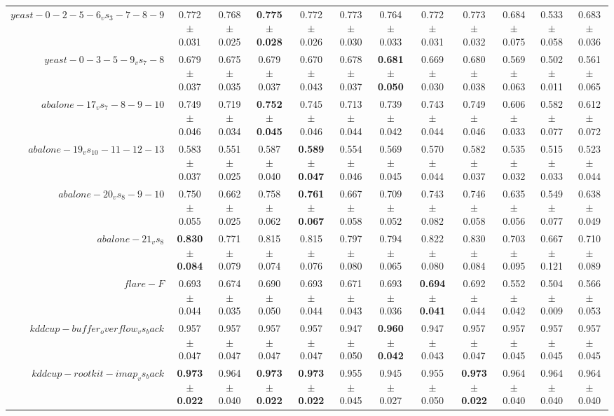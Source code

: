 \begin{table}[!ht]
{\begin{tabular}{r c c c c c c c c c c c}
$yeast-0-2-5-6_vs_3-7-8-9$ & 0.772 $\pm$ 0.031 & 0.768 $\pm$ 0.025 & \textbf{0.775 $\pm$ 0.028} & 0.772 $\pm$ 0.026 & 0.773 $\pm$ 0.030 & 0.764 $\pm$ 0.033 & 0.772 $\pm$ 0.031 & 0.773 $\pm$ 0.032 & 0.684 $\pm$ 0.075 & 0.533 $\pm$ 0.058 & 0.683 $\pm$ 0.036 \\
$yeast-0-3-5-9_vs_7-8$ & 0.679 $\pm$ 0.037 & 0.675 $\pm$ 0.035 & 0.679 $\pm$ 0.037 & 0.670 $\pm$ 0.043 & 0.678 $\pm$ 0.037 & \textbf{0.681 $\pm$ 0.050} & 0.669 $\pm$ 0.030 & 0.680 $\pm$ 0.038 & 0.569 $\pm$ 0.063 & 0.502 $\pm$ 0.011 & 0.561 $\pm$ 0.065 \\
$abalone-17_vs_7-8-9-10$ & 0.749 $\pm$ 0.046 & 0.719 $\pm$ 0.034 & \textbf{0.752 $\pm$ 0.045} & 0.745 $\pm$ 0.046 & 0.713 $\pm$ 0.044 & 0.739 $\pm$ 0.042 & 0.743 $\pm$ 0.044 & 0.749 $\pm$ 0.046 & 0.606 $\pm$ 0.033 & 0.582 $\pm$ 0.077 & 0.612 $\pm$ 0.072 \\
$abalone-19_vs_10-11-12-13$ & 0.583 $\pm$ 0.037 & 0.551 $\pm$ 0.025 & 0.587 $\pm$ 0.040 & \textbf{0.589 $\pm$ 0.047} & 0.554 $\pm$ 0.046 & 0.569 $\pm$ 0.045 & 0.570 $\pm$ 0.044 & 0.582 $\pm$ 0.037 & 0.535 $\pm$ 0.032 & 0.515 $\pm$ 0.033 & 0.523 $\pm$ 0.044 \\
$abalone-20_vs_8-9-10$ & 0.750 $\pm$ 0.055 & 0.662 $\pm$ 0.025 & 0.758 $\pm$ 0.062 & \textbf{0.761 $\pm$ 0.067} & 0.667 $\pm$ 0.058 & 0.709 $\pm$ 0.052 & 0.743 $\pm$ 0.082 & 0.746 $\pm$ 0.058 & 0.635 $\pm$ 0.056 & 0.549 $\pm$ 0.077 & 0.638 $\pm$ 0.049 \\
$abalone-21_vs_8$ & \textbf{0.830 $\pm$ 0.084} & 0.771 $\pm$ 0.079 & 0.815 $\pm$ 0.074 & 0.815 $\pm$ 0.076 & 0.797 $\pm$ 0.080 & 0.794 $\pm$ 0.065 & 0.822 $\pm$ 0.080 & 0.830 $\pm$ 0.084 & 0.703 $\pm$ 0.095 & 0.667 $\pm$ 0.121 & 0.710 $\pm$ 0.089 \\
$flare-F$ & 0.693 $\pm$ 0.044 & 0.674 $\pm$ 0.035 & 0.690 $\pm$ 0.050 & 0.693 $\pm$ 0.044 & 0.671 $\pm$ 0.043 & 0.693 $\pm$ 0.036 & \textbf{0.694 $\pm$ 0.041} & 0.692 $\pm$ 0.044 & 0.552 $\pm$ 0.042 & 0.504 $\pm$ 0.009 & 0.566 $\pm$ 0.053 \\
$kddcup-buffer_overflow_vs_back$ & 0.957 $\pm$ 0.047 & 0.957 $\pm$ 0.047 & 0.957 $\pm$ 0.047 & 0.957 $\pm$ 0.047 & 0.947 $\pm$ 0.050 & \textbf{0.960 $\pm$ 0.042} & 0.947 $\pm$ 0.043 & 0.957 $\pm$ 0.047 & 0.957 $\pm$ 0.045 & 0.957 $\pm$ 0.045 & 0.957 $\pm$ 0.045 \\
$kddcup-rootkit-imap_vs_back$ & \textbf{0.973 $\pm$ 0.022} & 0.964 $\pm$ 0.040 & \textbf{0.973 $\pm$ 0.022} & \textbf{0.973 $\pm$ 0.022} & 0.955 $\pm$ 0.045 & 0.945 $\pm$ 0.027 & 0.955 $\pm$ 0.050 & \textbf{0.973 $\pm$ 0.022} & 0.964 $\pm$ 0.040 & 0.964 $\pm$ 0.040 & 0.964 $\pm$ 0.040 \\

\end{tabular}}
\end{table}
